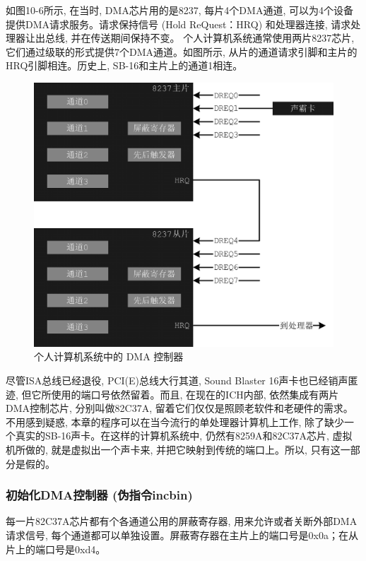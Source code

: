 \documentclass[12pt]{article}
\begin{document}
\begin{CJK}{UTF8}{gbsn}
如图10-6所示, 在当时, DMA芯片用的是8237, 每片4个DMA通道, 可以为4个设备提供DMA请求服务。请求保持信号 (Hold ReQuest：HRQ) 和处理器连接, 请求处理器让出总线, 并在传送期间保持不变。
个人计算机系统通常使用两片8237芯片, 它们通过级联的形式提供7个DMA通道。如图所示, 从片的通道请求引脚和主片的HRQ引脚相连。历史上, SB-16和主片上的通道1相连。
 
\begin{figure}
\begin{center}
\includegraphics[width=\textwidth]{eps/10-6.bmp.eps}
\caption{个人计算机系统中的 DMA 控制器}\label{dma}
\end{center}
\end{figure}

尽管ISA总线已经退役, PCI(E)总线大行其道, Sound Blaster 16声卡也已经销声匿迹, 但它所使用的端口号依然留着。而且, 在现在的ICH内部, 依然集成有两片DMA控制芯片, 分别叫做82C37A, 留着它们仅仅是照顾老软件和老硬件的需求。
不用感到疑惑, 本章的程序可以在当今流行的单处理器计算机上工作, 除了缺少一个真实的SB-16声卡。在这样的计算机系统中, 仍然有8259A和82C37A芯片, 虚拟机所做的, 就是虚拟出一个声卡来, 并把它映射到传统的端口上。所以, 只有这一部分是假的。

\subsubsection{初始化DMA控制器 (伪指令incbin) }
每一片82C37A芯片都有个各通道公用的屏蔽寄存器, 用来允许或者关断外部DMA请求信号, 每个通道都可以单独设置。屏蔽寄存器在主片上的端口号是0x0a；在从片上的端口号是0xd4。


\end{CJK}
\end{document}
